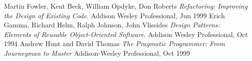 \documentclass[a4paper,10pt]{book}
\begin{document}
\tableofcontents







\begin{thebibliography}{9}
  Martin Fowler, Kent Beck, William Opdyke, Don Roberts
  \emph{Refactoring: Improving the Design of Existing Code}.
  Addison Wesley Professional, Jun 1999
  Erich Gamma, Richard Helm, Ralph Johnson, John Vlissides
  \emph{Design Patterns: Elements of Reusable Object-Oriented Software}.
  Addison Wesley Professional, Oct 1994 
  Andrew Hunt and David Thomas
  \emph{The Pragmatic Programmer: From Journeyman to Master}
  Addison-Wesley Professional, Oct 1999 

\end{thebibliography}
\end{document}
